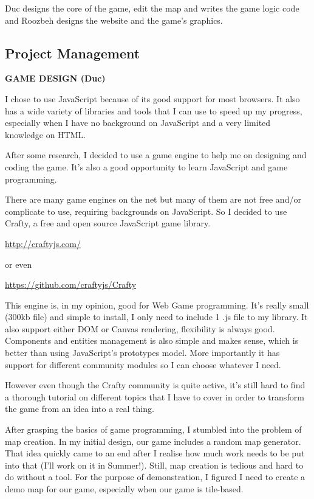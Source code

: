 \documentclass[a4wide, 11pt]{article}
\begin{document}
Duc designs the core of the game, edit the map and writes the game logic code and Roozbeh designs the website and the game’s graphics.

\subsection{Project Management}

\textbf{GAME DESIGN (Duc)}

I chose to use JavaScript because of its good support for most browsers. It also has a wide variety of libraries and tools that I can use to speed up my progress, especially when I
have no background on JavaScript and a very limited knowledge on HTML.

After some research, I decided to use a game engine to help me on designing and coding the game. It’s also a good opportunity to learn JavaScript and game programming.

There are many game engines on the net but many of them are not free and/or complicate to use, requiring backgrounds on JavaScript. So I decided to use Crafty, a free and open source JavaScript game library.

\url{http://craftyjs.com/}

or even

\url{https://github.com/craftyjs/Crafty}

This engine is, in my opinion, good for Web Game programming. It’s really small (300kb file) and simple to install, I only need to include 1 .js file to my library. It also support either DOM or Canvas rendering, flexibility is always good. Components and entities management is also simple and makes sense, which is better than using JavaScript’s prototypes model. More importantly it has support for different community modules so I can choose whatever I need. 

However even though the Crafty community is quite active, it’s still hard to find a thorough tutorial on different topics that I have to cover in order to transform the game from an idea into a real thing.

After grasping the basics of game programming, I stumbled into the problem of map creation. In my initial design, our game includes a random map generator. That idea quickly came to an end after I realise how much work needs to be put into that (I’ll work on it in Summer!). Still, map creation is tedious and hard to do without a tool. For the purpose of demonstration, I figured I need to create a demo map for our game, especially when our game is tile-based.
\end{document}

